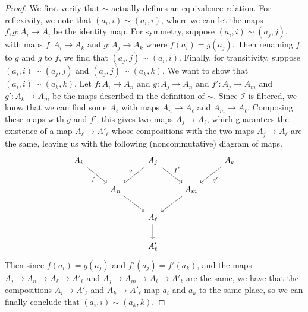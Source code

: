 \documentclass[psamsfonts]{amsart}
\theoremstyle{definition}
\theoremstyle{remark}
\begin{document}
\begin{proof}
We first verify that $\sim$ actually defines an equivalence relation. For reflexivity, we note that $(a_i, i) \sim (a_i,i)$, where we can let the maps $f,g : A_i \to A_i$ be the identity map. For symmetry, suppose $(a_i, i) \sim (a_j, j)$, with maps $f : A_i \to A_k$ and $g : A_j \to A_k$ where $f(a_i) = g(a_j)$. Then renaming $f$ to $g$ and $g$ to $f$, we find that $(a_j,j) \sim (a_i,i)$. Finally, for transitivity, suppose $(a_i,i) \sim (a_j,j)$ and $(a_j,j) \sim (a_k,k)$. We want to show that $(a_i,i) \sim (a_k,k)$. Let $f : A_i \to A_n$ and $g : A_j \to A_n$ and $f' : A_j \to A_m$ and $g' : A_k \to A_m$ be the maps described in the definition of $\sim$. Since $\mathscr{I}$ is filtered, we know that we can find some $A_\ell
$ with maps $A_n \to A_\ell$ and $A_m \to A_\ell$. Composing these maps with $g$ and $f'$, this gives two maps $A_j \to A_\ell$, which guarantees the existence of a map $A_\ell \to A'_\ell$ whose compositions with the two maps $A_j \to A_\ell$ are the same, leaving us with the following (noncommutative) diagram of maps.
$$\begin{tikzcd}
A_i \arrow[dr, "f"'] & & A_j  \arrow[dl, "g"'] \arrow[dr, "f'"]& & A_k \arrow[dl, "g'"] \\
& A_n \arrow[dr] & & A_m \arrow[dl] \\
& & A_\ell \arrow[d] & & \\
& & A'_\ell & &
\end{tikzcd}$$
Then since $f(a_i) = g(a_j)$ and $f'(a_j) = f'(a_k)$, and the maps $A_j \to A_n \to A_\ell \to A'_\ell$ and $A_j \to A_m \to A_\ell \to A'_\ell$ are the same, we have that the compositions $A_i \to A'_\ell$ and $A_k \to A'_\ell$ map $a_i$ and $a_k$ to the same place, so we can finally conclude that $(a_i,i) \sim (a_k,k)$.


\end{proof}
\end{document}
